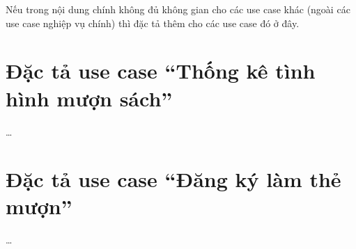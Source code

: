 ﻿\documentclass[../main.tex]{subfiles}
\begin{document}
Nếu trong nội dung chính không đủ không gian cho các use case khác (ngoài các use case nghiệp vụ chính) thì đặc tả thêm cho các use case đó ở đây.

\section{Đặc tả use case ``Thống kê tình hình mượn sách''}
\ldots

\section{Đặc tả use case ``Đăng ký làm thẻ mượn''}
\ldots
\end{document}
